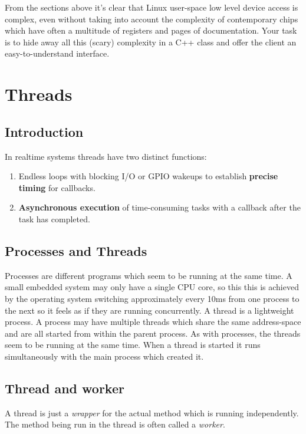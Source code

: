 \documentclass[12pt]{report}
\begin{document}
From the sections above it's clear that Linux user-space low level
device access is complex, even without taking into account the
complexity of contemporary chips which have often a multitude of
registers and pages of documentation. Your task is to hide away
all this (scary) complexity in a C++ class and offer the client
an easy-to-understand interface.





\chapter{Threads\label{threads}}

\section{Introduction}
In realtime systems threads have two distinct functions:
\begin{enumerate}
\item Endless loops with blocking I/O or GPIO wakeups
  to establish \textbf{precise timing} for callbacks.
\item \textbf{Asynchronous execution} of time-consuming tasks
  with a callback after the task has completed.
\end{enumerate}


\section{Processes and Threads}
Processes are different programs which seem to be running at the same
time. A small embedded system may only have a single CPU core,
so this this is achieved by the operating system switching
approximately every 10ms from one process to the next so it feels as
if they are running concurrently. A thread is a lightweight
process. A process may have  multiple threads which share the same
address-space and are all started from
within the parent process. As with processes, the threads seem to be
running at the same time. When a thread is started it runs
simultaneously with the main process which created it.

\section{Thread and worker}
A thread is just a \textsl{wrapper} for the actual method
which is running independently. The method being run in the thread
is often called a \textsl{worker}.
\end{document}
